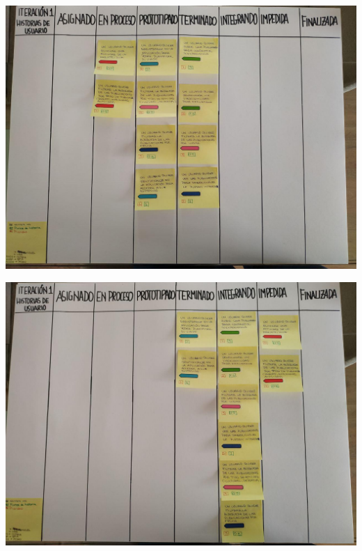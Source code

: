 \documentclass[spanish]{beamer}
\begin{document}
\begin{frame}
	\begin{center}
		\includegraphics[angle=90, scale=0.34]{papel1_8}
	\end{center}
\end{frame}


\begin{frame}
	\begin{center}
		\includegraphics[angle=180, scale=0.33]{papel1_9}
	\end{center}
\end{frame}
\end{document}
